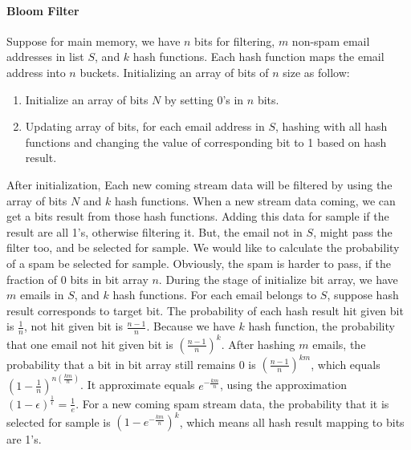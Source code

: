 \paragraph{Bloom Filter}

Suppose for main memory, we have $n$ bits for filtering, $m$ non-spam email
addresses in list $S$, and $k$ hash functions. Each hash function maps the email
address into $n$ buckets. Initializing an array of bits of $n$ size as follow: 

\begin{enumerate}
  \item Initialize an array of bits $N$ by setting 0's in $n$ bits.
  
  \item Updating array of bits, for each email address in $S$, hashing with all
  hash functions and changing the value of corresponding bit to 1 based on hash
  result.
\end{enumerate}

After initialization, Each new coming stream data will be filtered by using the
array of bits $N$ and $k$ hash functions. When a new stream data coming, we can
get a bits result from those hash functions. Adding this data for sample if the
result are all 1's, otherwise filtering it.  But, the email not in $S$, might
pass the filter too, and be selected for sample. We would like to calculate the
probability of a spam be selected for sample. Obviously, the spam
is harder to pass, if the fraction of 0 bits in bit array $n$. During the stage
of initialize bit array, we have $m$ emails in $S$, and $k$ hash functions. For
each email belongs to $S$, suppose hash result corresponds to target bit. The
probability of each hash result hit given bit is $\frac{1}{n}$, not hit given
bit is $\frac{n-1}{n}$. Because we have $k$ hash function, the probability that
one email not hit given bit is $(\frac{n-1}{n})^k$. After hashing $m$ emails,
the probability that a bit in bit array still remains 0 is
$(\frac{n-1}{n})^{km}$, which equals $(1-\frac{1}{n})^{n(\frac{km}{n})}$. It
approximate equals $e^{-\frac{km}{n}}$, using the approximation
$(1-\epsilon)^\frac{1}{\epsilon} = \frac{1}{e}$. For a new coming spam stream
data, the probability that it is selected for sample is
$(1-e^{-\frac{km}{n}})^k$, which means all hash result mapping to bits are 1's.

